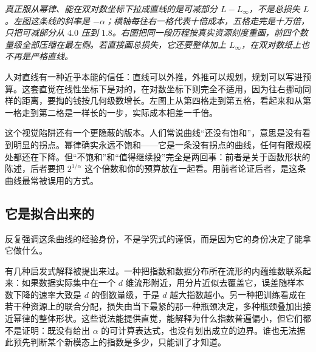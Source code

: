 \begin{center}
\end{center}

\emph{真正服从幂律、能在双对数坐标下拉成直线的是可减部分 \(L-L_\infty\)，不是总损失 \(L\)。左图这条线的斜率是 \(-\alpha\)；横轴每往右一格代表十倍成本，五格走完是十万倍，只把可减部分从 \(4.0\) 压到 \(1.8\)。右图把同一段历程按真实资源刻度重画，前四个数量级全部压缩在最左侧。若直接画总损失，它还要整体加上 \(L_\infty\)，在双对数纸上也不再是严格直线。}

人对直线有一种近乎本能的信任：直线可以外推，外推可以规划，规划可以写进预算。这套直觉在线性坐标下是对的，在对数坐标下则完全不适用，因为往右挪动同样的距离，要掏的钱按几何级数增长。左图上从第四格走到第五格，看起来和从第一格走到第二格是一样长的一步，实际成本相差一千倍。

这个视觉陷阱还有一个更隐蔽的版本。人们常说曲线``还没有饱和''，意思是没有看到明显的拐点。幂律确实永远不饱和——它是一条没有拐点的曲线，任何有限规模处都还在下降。但``不饱和''和``值得继续投''完全是两回事：前者是关于函数形状的陈述，后者要把 \(2^{1/\alpha}\) 这个倍数和你的预算放在一起看。用前者论证后者，是这条曲线最常被误用的方式。

\subsection{它是拟合出来的}

反复强调这条曲线的经验身份，不是学究式的谨慎，而是因为它的身份决定了能拿它做什么。

有几种启发式解释被提出来过。一种把指数和数据分布所在流形的内蕴维数联系起来：如果数据实际集中在一个 \(d\) 维流形附近，用分片近似去覆盖它，误差随样本数下降的速率大致是 \(d\) 的倒数量级，于是 \(d\) 越大指数越小。另一种把训练看成在若干种资源上的联合分配，损失由当下最紧的那一种瓶颈决定，多种瓶颈叠加出接近幂律的整体形状。这些说法能提供直觉，能解释为什么指数普遍偏小，但它们都不是证明：既没有给出 \(\alpha\) 的可计算表达式，也没有划出成立的边界。谁也无法据此预先判断某个新模态上的指数是多少，只能训了才知道。


